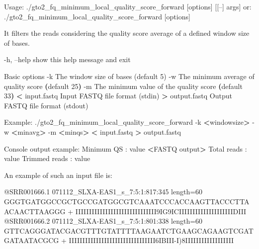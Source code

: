 \documentclass[11pt,]{krantz}
\newenvironment{Shaded}{\begin{snugshade}}{\end{snugshade}}
\newcommand{\KeywordTok}[1]{\textcolor[rgb]{0.27,0.27,0.27}{\textbf{#1}}}
\newcommand{\OperatorTok}[1]{\textcolor[rgb]{0.43,0.43,0.43}{\textbf{#1}}}
\newcommand{\ExtensionTok}[1]{#1}
\newcommand{\NormalTok}[1]{#1}
\begin{document}
\begin{Shaded}
\begin{Highlighting}[]
\ExtensionTok{Usage}\NormalTok{: ./gto2_fq_minimum_local_quality_score_forward [options] [[--] args]}
   \ExtensionTok{or}\NormalTok{: ./gto2_fq_minimum_local_quality_score_forward [options]}

\ExtensionTok{It}\NormalTok{ filters the reads considering the quality score average }
\ExtensionTok{of}\NormalTok{ a defined window size of bases.}

    \ExtensionTok{-h}\NormalTok{, --help        show this help message and exit}

\ExtensionTok{Basic}\NormalTok{ options}
    \ExtensionTok{-k}\NormalTok{                The window size of bases (default 5)}
    \ExtensionTok{-w}\NormalTok{                The minimum average of quality score }
                      \KeywordTok{(}\ExtensionTok{default}\NormalTok{ 25}\KeywordTok{)}
    \ExtensionTok{-m}\NormalTok{                The minimum value of the quality score }
                      \KeywordTok{(}\ExtensionTok{default}\NormalTok{ 33}\KeywordTok{)}
    \OperatorTok{<} \ExtensionTok{input.fastq}\NormalTok{     Input FASTQ file format (stdin)}
    \OperatorTok{>} \ExtensionTok{output.fastq}\NormalTok{    Output FASTQ file format (stdout)}

\ExtensionTok{Example}\NormalTok{: ./gto2_fq_minimum_local_quality_score_forward }
\ExtensionTok{-k} \OperatorTok{<}\NormalTok{windowsize}\OperatorTok{>}\NormalTok{ -w }\OperatorTok{<}\NormalTok{minavg}\OperatorTok{>}\NormalTok{ -m }\OperatorTok{<}\NormalTok{minqs}\OperatorTok{>} 
\OperatorTok{<} \ExtensionTok{input.fastq} \OperatorTok{>}\NormalTok{ output.fastq}

\ExtensionTok{Console}\NormalTok{ output example:}
\ExtensionTok{Minimum}\NormalTok{ QS       : value}
\OperatorTok{<}\ExtensionTok{FASTQ}\NormalTok{ output}\OperatorTok{>}
\ExtensionTok{Total}\NormalTok{ reads      : value}
\ExtensionTok{Trimmed}\NormalTok{ reads    : value}
\end{Highlighting}
\end{Shaded}

An example of such an input file is:

\begin{Shaded}
\begin{Highlighting}[]
\ExtensionTok{@SRR001666.1}\NormalTok{ 071112_SLXA-EAS1_s_7:5:1:817:345 length=60}
\ExtensionTok{GGGTGATGGCCGCTGCCGATGGCGTCAAATCCCACCAAGTTACCCTTAACAACTTAAGGG}
\ExtensionTok{+}
\ExtensionTok{IIIIIIIIIIIIIIIIIIIIIIIIIIIIII9IG9ICIIIIIIIIIIIIIIIIIIIIDIII}
\ExtensionTok{@SRR001666.2}\NormalTok{ 071112_SLXA-EAS1_s_7:5:1:801:338 length=60}
\ExtensionTok{GTTCAGGGATACGACGTTTGTATTTTAAGAATCTGAAGCAGAAGTCGATGATAATACGCG}
\ExtensionTok{+}
\ExtensionTok{IIIIIIIIIIIIIIIIIIIIIIIIIIIIIIII6IBIII-I}\NormalTok{)}\ExtensionTok{8IIIIIIIIIIIIIIIIII}
\end{Highlighting}
\end{Shaded}
\end{document}
